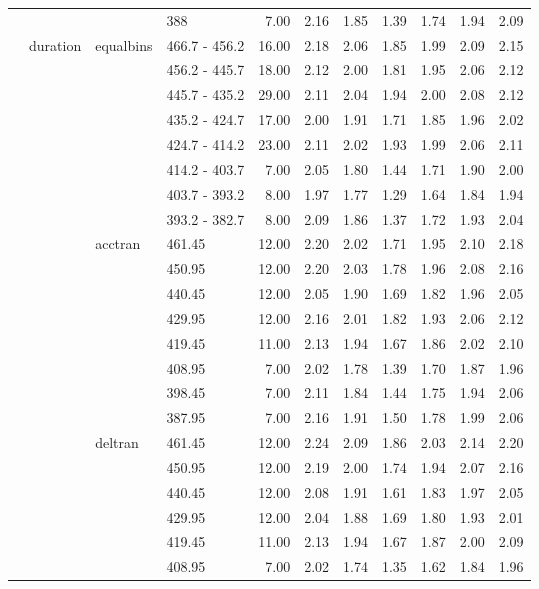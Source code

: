 \begin{longtable}{llllrrrrrrr}
   &  &  & 388 & 7.00 & 2.16 & 1.85 & 1.39 & 1.74 & 1.94 & 2.09 \\ 
   & duration & equalbins & 466.7 - 456.2 & 16.00 & 2.18 & 2.06 & 1.85 & 1.99 & 2.09 & 2.15 \\ 
   &  &  & 456.2 - 445.7 & 18.00 & 2.12 & 2.00 & 1.81 & 1.95 & 2.06 & 2.12 \\ 
   &  &  & 445.7 - 435.2 & 29.00 & 2.11 & 2.04 & 1.94 & 2.00 & 2.08 & 2.12 \\ 
   &  &  & 435.2 - 424.7 & 17.00 & 2.00 & 1.91 & 1.71 & 1.85 & 1.96 & 2.02 \\ 
   &  &  & 424.7 - 414.2 & 23.00 & 2.11 & 2.02 & 1.93 & 1.99 & 2.06 & 2.11 \\ 
   &  &  & 414.2 - 403.7 & 7.00 & 2.05 & 1.80 & 1.44 & 1.71 & 1.90 & 2.00 \\ 
   &  &  & 403.7 - 393.2 & 8.00 & 1.97 & 1.77 & 1.29 & 1.64 & 1.84 & 1.94 \\ 
   &  &  & 393.2 - 382.7 & 8.00 & 2.09 & 1.86 & 1.37 & 1.72 & 1.93 & 2.04 \\ 
   &  & acctran & 461.45 & 12.00 & 2.20 & 2.02 & 1.71 & 1.95 & 2.10 & 2.18 \\ 
   &  &  & 450.95 & 12.00 & 2.20 & 2.03 & 1.78 & 1.96 & 2.08 & 2.16 \\ 
   &  &  & 440.45 & 12.00 & 2.05 & 1.90 & 1.69 & 1.82 & 1.96 & 2.05 \\ 
   &  &  & 429.95 & 12.00 & 2.16 & 2.01 & 1.82 & 1.93 & 2.06 & 2.12 \\ 
   &  &  & 419.45 & 11.00 & 2.13 & 1.94 & 1.67 & 1.86 & 2.02 & 2.10 \\ 
   &  &  & 408.95 & 7.00 & 2.02 & 1.78 & 1.39 & 1.70 & 1.87 & 1.96 \\ 
   &  &  & 398.45 & 7.00 & 2.11 & 1.84 & 1.44 & 1.75 & 1.94 & 2.06 \\ 
   &  &  & 387.95 & 7.00 & 2.16 & 1.91 & 1.50 & 1.78 & 1.99 & 2.06 \\ 
   &  & deltran & 461.45 & 12.00 & 2.24 & 2.09 & 1.86 & 2.03 & 2.14 & 2.20 \\ 
   &  &  & 450.95 & 12.00 & 2.19 & 2.00 & 1.74 & 1.94 & 2.07 & 2.16 \\ 
   &  &  & 440.45 & 12.00 & 2.08 & 1.91 & 1.61 & 1.83 & 1.97 & 2.05 \\ 
   &  &  & 429.95 & 12.00 & 2.04 & 1.88 & 1.69 & 1.80 & 1.93 & 2.01 \\ 
   &  &  & 419.45 & 11.00 & 2.13 & 1.94 & 1.67 & 1.87 & 2.00 & 2.09 \\ 
   &  &  & 408.95 & 7.00 & 2.02 & 1.74 & 1.35 & 1.62 & 1.84 & 1.96 \\ 

\end{longtable}
